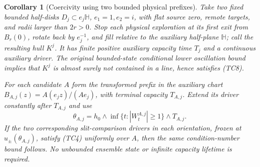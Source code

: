 \documentclass[11pt]{article}
\newtheorem{corollary}[theorem]{Corollary}
\theoremstyle{definition}\newtheorem{definition}[theorem]{Definition}
\theoremstyle{remark}\newtheorem{remark}[theorem]{Remark}
\begin{document}
\begin{corollary}[Coercivity using two bounded physical prefixes]
\label{cor:bounded-prefix-affine-coercivity}
Take two fixed bounded half-disks $D_j\subset e_j\mathbb H$,
$e_1=1,e_2=i$, with flat source zero, remote targets, and radii
larger than $2r>0$. Stop each physical exploration at its first
exit from $B_r(0)$, rotate back by $e_j^{-1}$, and fill relative
to the auxiliary half-plane $\mathbb H$; call the resulting hull
$K^j$. It has finite positive auxiliary capacity time $T_j$ and
a continuous auxiliary driver. The original bounded-state
conditional lower oscillation bound implies that $K^j$ is almost
surely not contained in a line, hence satisfies (TC8).

For each candidate $A$ form the transformed prefix in the auxiliary
chart $B_{A,j}(z)=A(e_jz)/(Ae_j)$, with terminal capacity $T_{A,j}$.
Extend its driver constantly after $T_{A,j}$ and use
\[
 \theta_{A,j}=h_0\wedge\inf\{t:|W_t^{A,j}|\ge1\}
                                     \wedge T_{A,j}.
 \tag{TC11}
\]
If the two corresponding slit-comparison drivers in each orientation,
frozen at $u_\pm(\theta_{A,j})$, satisfy (TC4) uniformly over $A$,
then the same condition-number bound follows. No unbounded ensemble
state or infinite capacity lifetime is required.
\end{corollary}
\end{document}
